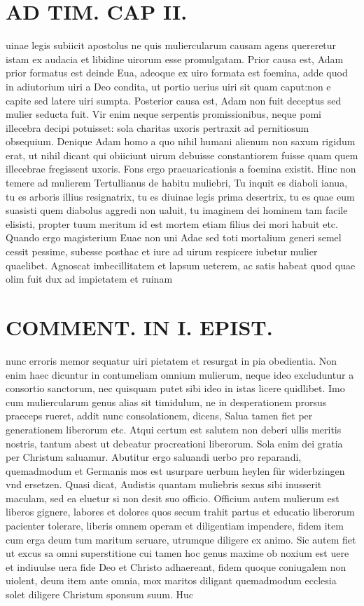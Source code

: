 \documentclass{article}
\begin{document}
\begin{pages}
\section*{AD TIM. CAP II. }
\marginpar{[ p.121 ]}\pstart uinae legis subiicit apostolus ne quis muliercularum causam agens quereretur istam ex audacia et libidine uirorum esse promulgatam. Prior causa est, Adam prior formatus est deinde Eua, adeoque ex uiro formata est foemina, adde quod in adiutorium uiri a Deo condita, ut portio uerius uiri sit quam caput:non e capite sed latere uiri sumpta. Posterior causa est, Adam non fuit deceptus sed mulier seducta fuit. Vir enim neque serpentis promissionibus, neque pomi illecebra decipi potuisset: sola charitas uxoris pertraxit ad pernitiosum obsequium. Denique Adam homo a quo nihil humani alienum non saxum rigidum erat, ut nihil dicant qui obiiciunt uirum debuisse constantiorem fuisse quam quem illecebrae fregissent uxoris. Fons ergo praeuaricationis a foemina existit. Hinc non temere ad mulierem Tertullianus de habitu muliebri, Tu inquit es diaboli ianua, tu es arboris illius resignatrix, tu es diuinae legis prima desertrix, tu es quae eum suasisti quem diabolus aggredi non ualuit, tu imaginem dei hominem tam facile elisisti, propter tuum meritum id est mortem etiam filius dei mori habuit etc. Quando ergo magisterium Euae non uni Adae sed toti mortalium generi semel cessit pessime, subesse posthac et iure ad uirum respicere iubetur mulier quaelibet. Agnoscat imbecillitatem et lapsum ueterem, ac satis habeat quod quae olim fuit dux ad impietatem et ruinam  \pend
\section*{COMMENT. IN I. EPIST. }\pstart nunc erroris memor sequatur uiri pietatem et resurgat in pia obedientia. Non enim haec dicuntur in contumeliam omnium mulierum, neque ideo excluduntur a consortio sanctorum, nec quisquam putet sibi ideo in istas licere quidlibet. Imo cum muliercularum genus alias sit timidulum, ne in desperationem prorsus praeceps rueret, addit nunc consolationem, dicens, Salua tamen fiet per generationem liberorum etc. Atqui certum est salutem non deberi ullis meritis nostris, tantum abest ut debeatur procreationi liberorum. Sola enim dei gratia per Christum saluamur. Abutitur ergo saluandi uerbo pro reparandi, quemadmodum et Germanis mos est usurpare uerbum heylen für widerbzingen vnd ersetzen. Quasi dicat, Audistis quantam muliebris sexus sibi inusserit maculam, sed ea eluetur si non desit suo officio. Officium autem mulierum est liberos gignere, labores et dolores quos secum trahit partus et educatio liberorum pacienter tolerare, liberis omnem operam et diligentiam impendere, fidem item cum erga deum tum maritum seruare, utrumque diligere ex animo. Sic autem fiet ut excus sa omni superstitione cui tamen hoc genus maxime ob noxium est uere et indiuulse uera fide Deo et Christo adhaereant, fidem quoque coniugalem non uiolent, deum item ante omnia, mox maritos diligant quemadmodum ecclesia solet diligere Christum sponsum suum. Huc  \pend

\end{pages}
\end{document}
